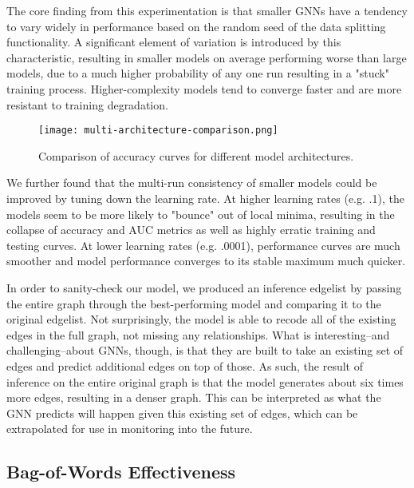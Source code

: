 \documentclass[10pt,twocolumn,letterpaper]{article}
\begin{document}
The core finding from this experimentation is that smaller GNNs have a tendency to vary widely in performance based on the random seed of the data splitting functionality. A significant element of variation is introduced by this characteristic, resulting in smaller models on average performing worse than large models, due to a much higher probability of any one run resulting in a "stuck" training process. Higher-complexity models tend to converge faster and are more resistant to training degradation. 

\begin{figure}[t]
\begin{center}

   \texttt{[image: multi-architecture-comparison.png]}
\end{center}
   \caption{Comparison of accuracy curves for different model architectures.}
\label{fig:long}
\label{fig:onecol}
\end{figure}

We further found that the multi-run consistency of smaller models could be improved by tuning down the learning rate. At higher learning rates (e.g. .1), the models seem to be more likely to "bounce" out of local minima, resulting in the collapse of accuracy and AUC metrics as well as highly erratic training and testing curves. At lower learning rates (e.g. .0001), performance curves are much smoother and model performance converges to its stable maximum much quicker.

In order to sanity-check our model, we produced an inference edgelist by passing the entire graph through the best-performing model and comparing it to the original edgelist. Not surprisingly, the model is able to recode all of the existing edges in the full graph, not missing any relationships. What is interesting--and challenging--about GNNs, though, is that they are built to take an existing set of edges and predict additional edges on top of those. As such, the result of inference on the entire original graph is that the model generates about six times more edges, resulting in a denser graph. This can be interpreted as what the GNN predicts will happen given this existing set of edges, which can be extrapolated for use in monitoring into the future. 

\subsection{Bag-of-Words Effectiveness}
\end{document}
